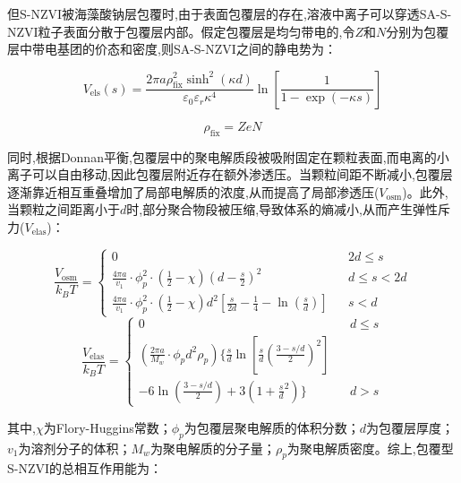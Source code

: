 但S-NZVI被海藻酸钠层包覆时,由于表面包覆层的存在,溶液中离子可以穿透SA-S-NZVI粒子表面分散于包覆层内部。假定包覆层是均匀带电的,令$Z$和$N$分别为包覆层中带电基团的价态和密度,则SA-S-NZVI之间的静电势为：\cite{OHSHIMA20152,vskvarla2020unified,2006390}

\begin{equation}
    V_\mathrm{els}(s)=\frac{2 \pi a \rho_\mathrm{fix}^2 \sinh^2(\kappa d)}{\varepsilon _0 \varepsilon _r\kappa ^4}\ln[\frac{1}{1-\exp(-\kappa s)}]
\end{equation}

\begin{equation}
    \rho_\mathrm{fix}=ZeN
\end{equation}

同时,根据Donnan平衡,包覆层中的聚电解质段被吸附固定在颗粒表面,而电离的小离子可以自由移动,因此包覆层附近存在额外渗透压。当颗粒间距不断减小,包覆层逐渐靠近相互重叠增加了局部电解质的浓度,从而提高了局部渗透压($V_\mathrm{osm}$)\cite{2002Electrosteric}。此外,当颗粒之间距离小于$d$时,部分聚合物段被压缩,导致体系的熵减小,从而产生弹性斥力($V_\mathrm{elas}$)\cite{doi:10.1080/07388551.2018.1440525}：

\begin{equation}
    \frac{V_\mathrm{osm}}{k_BT}=\left\{
        \begin{array}{lcl} %
            0& &{2d\leqslant s}\\
            \frac{4 \pi a }{v_1}\cdot\phi _p^2\cdot(\frac{1}{2}-\chi )(d-\frac{s}{2})^2& &{d\leqslant s <2d}\\
            \frac{4 \pi a }{v_1}\cdot\phi _p^2\cdot(\frac{1}{2}-\chi )d^2[\frac{s}{2d}-\frac{1}{4}-\ln(\frac{s}{d})]& &{s<d}
        \end{array}\right.
\end{equation}
\begin{equation}
    \frac{V_\mathrm{elas}}{k_BT}=\left\{
        \begin{array}{lcl}
            0& &{d\leqslant s}\\
            (\frac{2\pi a}{M_w}\cdot\phi_pd^2\rho_p)\{\frac{s}{d}\ln[\frac{s}{d}(\frac{3-s/d}{2})^2]\\ -6\ln(\frac{3-s/d}{2})+3(1+\frac{s}{d}^2)\}& &{d>s}
        \end{array}\right.
\end{equation}

其中,$\chi$为Flory-Huggins常数；$\phi_p$为包覆层聚电解质的体积分数；$d$为包覆层厚度；$v_1$为溶剂分子的体积；$M_w$为聚电解质的分子量；$\rho_p$为聚电解质密度。综上,包覆型S-NZVI的总相互作用能为：

